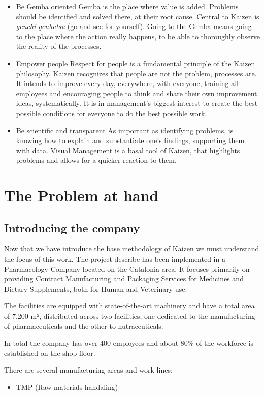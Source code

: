 \documentclass[]{article}
\begin{document}
\begin{itemize}
  \item Be Gemba oriented
    \subitem Gemba is the place where value is added. Problems should be identified and solved there, at their root cause.
    Central to Kaizen is \textit{genchi genbutsu} (go and see for yourself). Going to the Gemba means going to the place where the action really happens, to be able to thoroughly observe the reality of the processes.
  \item Empower people
    \subitem Respect for people is a fundamental principle of the Kaizen philosophy. Kaizen recognizes that people are not the problem, processes are. It intends to improve every day, everywhere, with everyone, training all employees and encouraging people to think and share their own improvement ideas, systematically. It is in management’s biggest interest to create the best possible conditions for everyone to do the best possible work.
  \item Be scientific and transparent
    \subitem As important as identifying problems, is knowing how to explain and substantiate one’s findings, supporting them with data. Visual Management is a basal tool of Kaizen, that highlights problems and allows for a quicker reaction to them.
\end{itemize}
\clearpage
\newpage

\section{The Problem at hand}
\subsection{Introducing the company}

Now that we have introduce the base methodology of Kaizen we must understand the focus of this work.
The project describe has been implemented in a Pharmacology Company located on the Catalonia area. It focuses primarily on providing Contract Manufacturing and Packaging Services for Medicines and Dietary Supplements, both for Human and Veterinary use.

The facilities are equipped with state-of-the-art machinery and have a total area of 7.200 m², distributed across two facilities, one dedicated to the manufacturing of pharmaceuticals and the other to nutraceuticals.

In total the company has over 400 employees and about 80\% of the workforce is established on the shop floor.

There are several manufacturing areas and work lines:

\begin{itemize}
  \item TMP (Raw materials handaling)

\end{itemize}
\clearpage
\newpage
\printbibliography[heading=bibnumbered]
\end{document}

